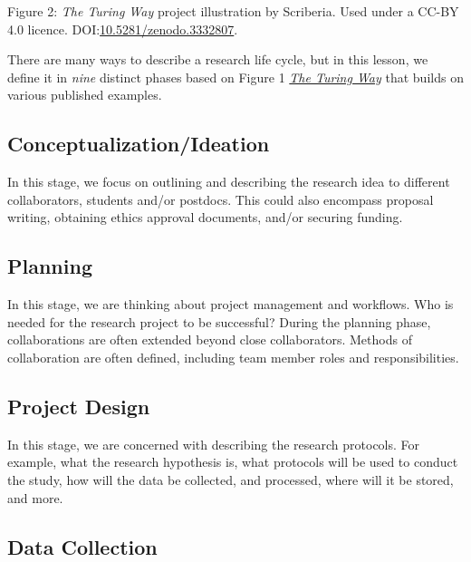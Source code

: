 \documentclass[
  letterpaper,
  DIV=11,
  numbers=noendperiod]{scrreport}
\begin{document}
Figure 2: \emph{The Turing Way} project illustration by Scriberia. Used
under a CC-BY 4.0 licence.
DOI:\href{https://doi.org/10.5281/zenodo.3332807}{10.5281/zenodo.3332807}.

There are many ways to describe a research life cycle, but in this
lesson, we define it in \emph{nine} distinct phases based on Figure 1
\href{https://the-turing-way.netlify.app/reproducible-research/overview.html}{\emph{The
Turing Way}} that builds on various published examples.

\hypertarget{conceptualizationideation}{%
\subsection{Conceptualization/Ideation}\label{conceptualizationideation}}

In this stage, we focus on outlining and describing the research idea to
different collaborators, students and/or postdocs. This could also
encompass proposal writing, obtaining ethics approval documents, and/or
securing funding.

\hypertarget{planning-1}{%
\subsection{Planning}\label{planning-1}}

In this stage, we are thinking about project management and workflows.
Who is needed for the research project to be successful? During the
planning phase, collaborations are often extended beyond close
collaborators. Methods of collaboration are often defined, including
team member roles and responsibilities.

\hypertarget{project-design}{%
\subsection{Project Design}\label{project-design}}

In this stage, we are concerned with describing the research protocols.
For example, what the research hypothesis is, what protocols will be
used to conduct the study, how will the data be collected, and
processed, where will it be stored, and more.

\hypertarget{data-collection}{%
\subsection{Data Collection}\label{data-collection}}
\end{document}
